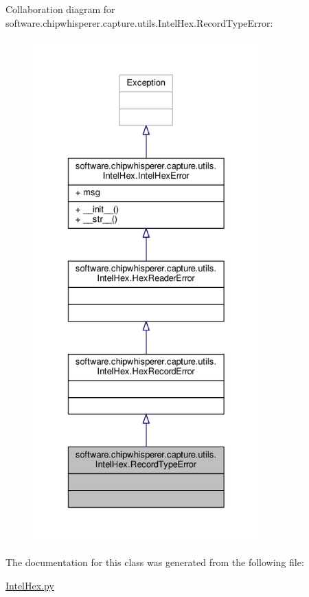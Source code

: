 Collaboration diagram for software.\+chipwhisperer.\+capture.\+utils.\+Intel\+Hex.\+Record\+Type\+Error\+:\nopagebreak
\begin{figure}[H]
\begin{center}
\leavevmode
\includegraphics[height=550pt]{d4/d8e/classsoftware_1_1chipwhisperer_1_1capture_1_1utils_1_1IntelHex_1_1RecordTypeError__coll__graph}
\end{center}
\end{figure}


The documentation for this class was generated from the following file\+:\begin{DoxyCompactItemize}
\item 
\hyperlink{IntelHex_8py}{Intel\+Hex.\+py}\end{DoxyCompactItemize}
